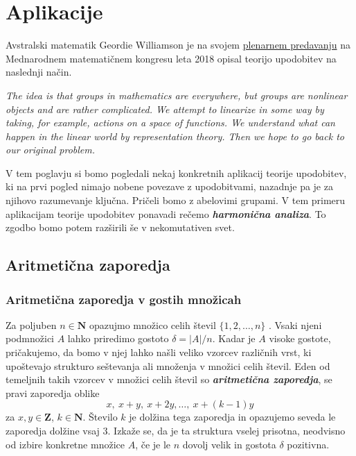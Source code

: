 \documentclass[11pt]{book}
\def\NN{\mathbf{N}}
\def\ZZ{\mathbf{Z}}
\def\definicija{\color{rdeca}\bf\em}
\theoremstyle{definition}
\theoremstyle{zgled}
\theoremstyle{odprtproblem}
\theoremstyle{domacanaloga}
\theoremstyle{izrek}
\begin{document}
\chapter{Aplikacije}

Avstralski matematik Geordie Williamson je na svojem \href{https://www.youtube.com/watch?v=-3q6C558yog}{plenarnem predavanju} na Mednarodnem matematičnem kongresu leta 2018 opisal teorijo upodobitev na naslednji način.

\smallskip 

\emph{The idea is that groups in mathematics are everywhere, but groups are nonlinear objects and are rather complicated. We attempt to linearize in some way by taking, for example, actions on a space of functions. We understand what can happen in the linear world by representation theory. Then we hope to go back to our original problem.}

\smallskip

V tem poglavju si bomo pogledali nekaj konkretnih aplikacij teorije upodobitev, ki na prvi pogled nimajo nobene povezave z upodobitvami, nazadnje pa je za njihovo razumevanje ključna. Pričeli bomo z abelovimi grupami. V tem primeru aplikacijam teorije upodobitev ponavadi rečemo {\definicija harmonična analiza}. To zgodbo bomo potem razširili še v nekomutativen svet.

\section{Aritmetična zaporedja}

\subsection{Aritmetična zaporedja v gostih množicah}

Za poljuben $n \in \NN$ opazujmo množico celih števil $\{ 1, 2, \dots, n \}$ . Vsaki njeni podmnožici $A$ lahko priredimo gostoto $\delta = |A|/n$. Kadar je $A$ visoke gostote, pričakujemo, da bomo v njej lahko našli veliko vzorcev različnih vrst, ki upoštevajo strukturo seštevanja ali množenja v množici celih števil. Eden od temeljnih takih vzorcev v množici celih števil so {\definicija aritmetična zaporedja}, se pravi zaporedja oblike
\[
    x, \ x+y, \ x+2y, \dots, \ x + (k-1)y
\]
za $x,y \in \ZZ$, $k \in \NN$. Število $k$ je dolžina tega zaporedja in opazujemo seveda le zaporedja dolžine vsaj $3$. Izkaže se, da je ta struktura vselej prisotna, neodvisno od izbire konkretne množice $A$, če je le $n$ dovolj velik in gostota $\delta$ pozitivna.
\end{document}
